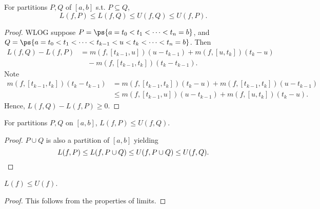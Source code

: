 \documentclass[11pt]{scrartcl}
\numberwithin{equation}{section}
\begin{document}
\begin{lemma}
    For partitions $P,Q$ of $[a,b]$ s.t. $P \subseteq Q$,
    \[
        L(f,P) \leq L(f,Q) \leq U(f,Q) \leq U(f,P).
    \]
\end{lemma}

\begin{proof}
    WLOG suppose $P = \ps{a=t_0<t_1<\cdots<t_n = b}$, and \\
    $Q = \ps{a=t_0<t_1<\cdots<t_{k-1}<u<t_k<\cdots<t_n = b}$.
    Then 
    \begin{align*}
        L(f,Q) - L(f,P) &= m(f, [t_{k-1},u])(u-t_{k-1}) + m(f, [u,t_{k}])(t_{k}-u)\\ &\quad- m(f,[t_{k-1},t_k])(t_k-t_{k-1}).
    \end{align*}
    Note 
    \begin{align*}
        m(f,[t_{k-1},t_k])(t_k-t_{k-1}) &= m(f,[t_{k-1},t_k])(t_k-u) + m(f,[t_{k-1},t_k])(u-t_{k-1}) \\
        &\leq m(f, [t_{k-1},u])(u-t_{k-1}) + m(f, [u,t_{k}])(t_{k}-u).
    \end{align*}
    Hence, $L(f,Q)-L(f,P)\geq 0$.
\end{proof}

\begin{lemma}
    For partitions $P,Q$ on $[a,b]$, $L(f,P)\leq U(f,Q)$.
\end{lemma}
\begin{proof}
    $P\cup Q$ is also a partition of $[a,b]$ yielding 
    \[
        L(f,P) \leq L(f,P\cup Q) \leq  U(f,P\cup Q) \leq U(f,Q).\qedhere
    \]
\end{proof}
\begin{proposition}
    $L(f)\leq U(f)$.
\end{proposition}

\begin{proof}
    This follows from the properties of limits.
\end{proof}
\end{document}
